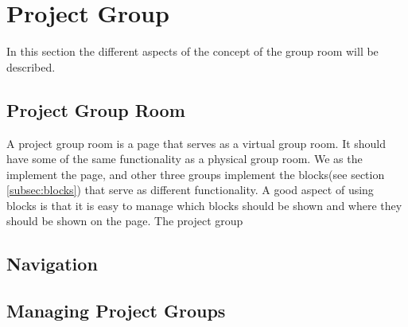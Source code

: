 \section{Project Group}
In this section the different aspects of the concept of the group room will be described.
\subsection{Project Group Room}
A project group room is a page that serves as a virtual group room. 
It should have some of the same functionality as a physical group room.
We as the \groupname{} implement the page, and other three groups implement the blocks(see section \ref{subsec:blocks}) that serve as different functionality.
A good aspect of using blocks is that it is easy to manage which blocks should be shown and where they should be shown on the page.
The project group



\subsection{Navigation}

\subsection{Managing Project Groups}